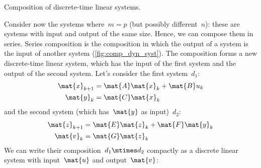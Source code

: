 \begin{marginfigure}
    \centering
    \caption{Composition of discrete-time linear systems.}
    \label{fig:comp_dyn_syst}
\end{marginfigure}

Consider now the systems where~$m=p$ (but possibly different~$n$): these are systems with input and output of the same size.
Hence, we can compose them in series.
Series composition is the composition in which the output of a system is the input of another system (\cref{fig:comp_dyn_syst}).
The composition forms a new discrete-time linear system, which has the input of the first system and the output of the second system.
Let's consider the first system~$d_1$:
\begin{equation*}
    \label{eq:dlin-1}
    \begin{aligned}
        \mat{x}_{k+1} &= \mat{A} \mat{x}_k + \mat{B} u_k \\
        \mat{y}_{k}   &= \mat{C} \mat{x}_k
    \end{aligned}
\end{equation*}
and the second system (which has~$\mat{y}$ as input)~$d_2$:
\begin{equation*}
    \label{eq:dlin-2}
    \begin{aligned}
        \mat{z}_{k+1} &= \mat{E} \mat{z}_k + \mat{F} \mat{y}_k \\
        \mat{v}_{k}   &= \mat{G} \mat{z}_k
    \end{aligned}
\end{equation*}
We can write their composition~$d_1\mtimes d_2$ compactly as a discrete linear system with input~$\mat{u}$ and output~$\mat{v}$:
